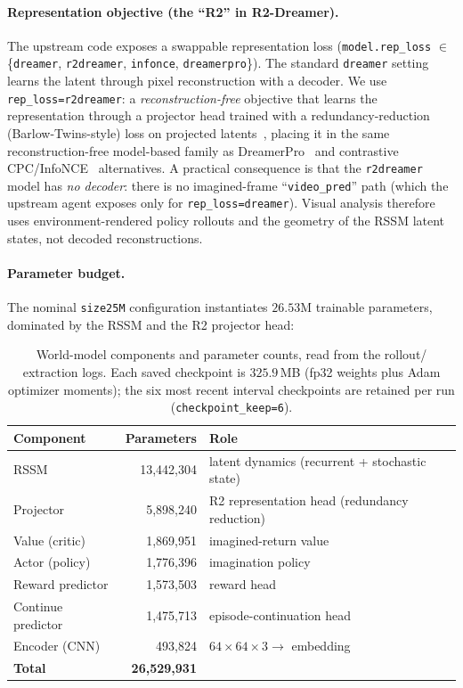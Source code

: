 \documentclass[11pt]{article}
\begin{document}
\paragraph{Representation objective (the ``R2'' in R2-Dreamer).} The upstream
code exposes a swappable representation loss
(\texttt{model.rep\_loss} $\in$ \{\texttt{dreamer}, \texttt{r2dreamer},
\texttt{infonce}, \texttt{dreamerpro}\}). The standard \texttt{dreamer} setting
learns the latent through
pixel reconstruction with a decoder. We use \texttt{rep\_loss=r2dreamer}: a
\emph{reconstruction-free} objective that learns the representation through a
projector head trained with a redundancy-reduction (Barlow-Twins-style) loss
on projected latents~\cite{barlow}, placing it in the same reconstruction-free
model-based family as DreamerPro~\cite{dreamerpro} and contrastive
CPC/InfoNCE~\cite{cpc} alternatives. A practical consequence is that the
\texttt{r2dreamer} model has \emph{no decoder}: there is no imagined-frame
``\texttt{video\_pred}'' path (which the upstream agent exposes only for
\texttt{rep\_loss=dreamer}). Visual analysis therefore uses environment-rendered
policy rollouts and the geometry of the RSSM latent states, not decoded
reconstructions.

\paragraph{Parameter budget.} The nominal \texttt{size25M} configuration
instantiates $26.53$M trainable parameters, dominated by the RSSM and the R2
projector head:

\begin{table}[h]
\centering
\small
\begin{tabular}{lrl}
\toprule
Component & Parameters & Role \\
\midrule
RSSM                 & 13{,}442{,}304 & latent dynamics (recurrent + stochastic state) \\
Projector            &  5{,}898{,}240 & R2 representation head (redundancy reduction) \\
Value (critic)       &  1{,}869{,}951 & imagined-return value \\
Actor (policy)       &  1{,}776{,}396 & imagination policy \\
Reward predictor     &  1{,}573{,}503 & reward head \\
Continue predictor   &  1{,}475{,}713 & episode-continuation head \\
Encoder (CNN)        &    493{,}824 & $64\times64\times3 \rightarrow$ embedding \\
\midrule
\textbf{Total}       & \textbf{26{,}529{,}931} & \\
\bottomrule
\end{tabular}
\caption{World-model components and parameter counts, read from the rollout/
extraction logs. Each saved checkpoint is $325.9$\,MB (fp32 weights plus Adam
optimizer moments); the six most recent interval checkpoints are retained per
run (\texttt{checkpoint\_keep=6}).}
\label{tab:model}
\end{table}
\end{document}

